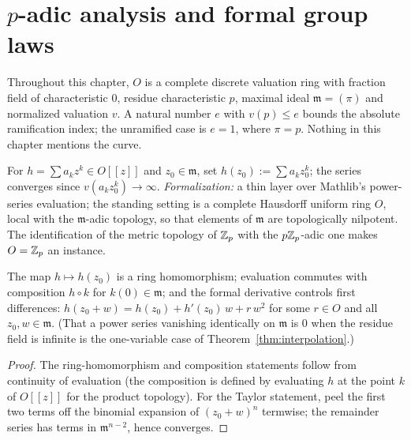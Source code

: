 \chapter{$p$-adic analysis and formal group laws}
Throughout this chapter, $O$ is a complete discrete valuation ring with fraction field of
characteristic $0$, residue characteristic $p$, maximal ideal $\mathfrak m = (\pi)$ and
normalized valuation $v$. A natural number $e$ with $v(p) \le e$ bounds the absolute
ramification index; the unramified case is $e = 1$, where $\pi = p$. Nothing in this chapter
mentions the curve.

\begin{definition}
\label{def:eval}
\leanok
For $h = \sum a_k z^k \in O[[z]]$ and $z_0 \in \mathfrak m$, set
$h(z_0) := \sum a_k z_0^k$; the series converges since $v(a_k z_0^k) \to \infty$.
\emph{Formalization:} a thin layer over Mathlib's power-series evaluation; the standing
setting is a complete Hausdorff uniform ring $O$, local with the $\mathfrak m$-adic
topology, so that elements of $\mathfrak m$ are topologically nilpotent. The
identification of the metric topology of $\mathbb{Z}_p$ with the $p\mathbb{Z}_p$-adic one makes
$O = \mathbb{Z}_p$ an instance.
\end{definition}

\begin{lemma}
\label{lem:eval-hom}
\leanok
{}
The map $h \mapsto h(z_0)$ is a ring homomorphism; evaluation commutes with composition
$h \circ k$ for $k(0) \in \mathfrak m$; and the formal derivative controls first
differences: $h(z_0 + w) = h(z_0) + h'(z_0)\,w + r\,w^2$ for some $r \in O$ and all
$z_0, w \in \mathfrak m$. (That a power series vanishing identically on $\mathfrak m$ is
$0$ when the residue field is infinite is the one-variable case of
Theorem~\ref{thm:interpolation}.)
\end{lemma}
\begin{proof}
\leanok
The ring-homomorphism and composition statements follow from continuity of evaluation
(the composition is defined by evaluating $h$ at the point $k$ of $O[[z]]$ for the
product topology). For the Taylor statement, peel the first two terms off the binomial
expansion of $(z_0 + w)^n$ termwise; the remainder series has terms in
$\mathfrak m^{n-2}$, hence converges.
\end{proof}

